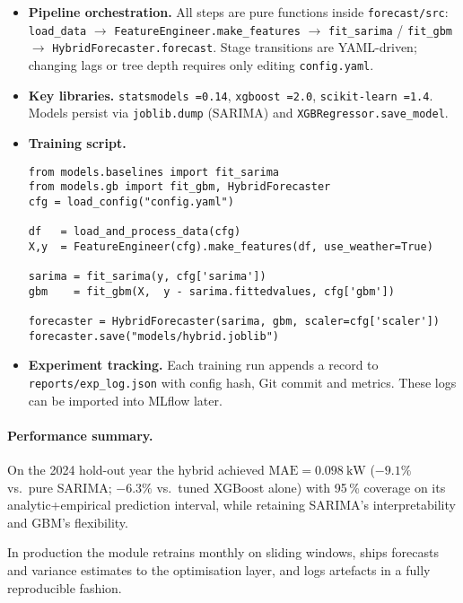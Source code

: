 \begin{itemize}
  \item \textbf{Pipeline orchestration.}  
        All steps are pure functions inside \texttt{forecast/src}:  
        \texttt{load\_data} \(\to\) \texttt{FeatureEngineer.make\_features} \(\to\) \texttt{fit\_sarima} / \texttt{fit\_gbm} \(\to\) \texttt{HybridForecaster.forecast}.
        Stage transitions are YAML-driven; changing lags or tree depth requires only editing \texttt{config.yaml}.
  \item \textbf{Key libraries.}  
        \texttt{statsmodels~=0.14}, \texttt{xgboost~=2.0}, \texttt{scikit-learn~=1.4}.  
        Models persist via \texttt{joblib.dump} (SARIMA) and \texttt{XGBRegressor.save\_model}.
  \item \textbf{Training script.}
\begin{verbatim}
from models.baselines import fit_sarima
from models.gb import fit_gbm, HybridForecaster
cfg = load_config("config.yaml")

df   = load_and_process_data(cfg)
X,y  = FeatureEngineer(cfg).make_features(df, use_weather=True)

sarima = fit_sarima(y, cfg['sarima'])
gbm    = fit_gbm(X,  y - sarima.fittedvalues, cfg['gbm'])

forecaster = HybridForecaster(sarima, gbm, scaler=cfg['scaler'])
forecaster.save("models/hybrid.joblib")
\end{verbatim}
  \item \textbf{Experiment tracking.}  
        Each training run appends a record to \texttt{reports/exp\_log.json} with config hash, Git commit and metrics.  These logs can be imported into MLflow later.
\end{itemize}

\paragraph{Performance summary.}  On the 2024 hold-out year the hybrid achieved
\(\mathrm{MAE}=0.098~\text{kW}\) (\(\mathbf{-9.1\%}\) vs.\ pure SARIMA; \(-6.3\%\) vs.\ tuned XGBoost alone) with 95\,\% coverage on its analytic+empirical prediction interval, while retaining SARIMA’s interpretability and GBM’s flexibility.

\bigskip
In production the module retrains monthly on sliding windows, ships forecasts and variance estimates to the optimisation layer, and logs artefacts in a fully reproducible fashion.